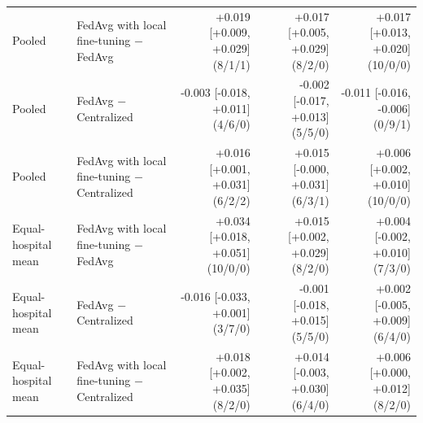 \begin{table}[ht]
\begin{tabular}{llrrr}
Pooled & FedAvg with local fine-tuning $-$ FedAvg & +0.019 [+0.009, +0.029] (8/1/1) & +0.017 [+0.005, +0.029] (8/2/0) & +0.017 [+0.013, +0.020] (10/0/0) \\
Pooled & FedAvg $-$ Centralized & -0.003 [-0.018, +0.011] (4/6/0) & -0.002 [-0.017, +0.013] (5/5/0) & -0.011 [-0.016, -0.006] (0/9/1) \\
Pooled & FedAvg with local fine-tuning $-$ Centralized & +0.016 [+0.001, +0.031] (6/2/2) & +0.015 [-0.000, +0.031] (6/3/1) & +0.006 [+0.002, +0.010] (10/0/0) \\
Equal-hospital mean & FedAvg with local fine-tuning $-$ FedAvg & +0.034 [+0.018, +0.051] (10/0/0) & +0.015 [+0.002, +0.029] (8/2/0) & +0.004 [-0.002, +0.010] (7/3/0) \\
Equal-hospital mean & FedAvg $-$ Centralized & -0.016 [-0.033, +0.001] (3/7/0) & -0.001 [-0.018, +0.015] (5/5/0) & +0.002 [-0.005, +0.009] (6/4/0) \\
Equal-hospital mean & FedAvg with local fine-tuning $-$ Centralized & +0.018 [+0.002, +0.035] (8/2/0) & +0.014 [-0.003, +0.030] (6/4/0) & +0.006 [+0.000, +0.012] (8/2/0) \\
\bottomrule
\end{tabular}
\end{table}
